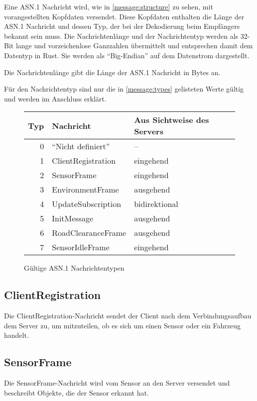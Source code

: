 Eine ASN.1 Nachricht wird, wie in \autoref{message:structure} zu sehen, mit  vorangestellten Kopfdaten versendet.
Diese Kopfdaten enthalten die Länge der ASN.1 Nachricht und dessen Typ, der bei der Dekodierung beim Empfängers bekannt sein muss.
Die Nachrichtenlänge und der Nachrichtentyp werden als 32-Bit lange und vorzeichenlose Ganzzahlen übermittelt und entsprechen damit dem Datentyp  in Rust.
Sie werden als \enquote{Big-Endian} auf dem Datenstrom dargestellt.

Die Nachrichtenlänge gibt die Länge der ASN.1 Nachricht in Bytes an.

Für den Nachrichtentyp sind nur die in \autoref{message:types} gelisteten Werte gültig und werden im Anschluss erklärt.

\begin{figure}[H]
	\centering
	\begin{tabular}{r|l|l}
		Typ & Nachricht & Aus Sichtweise des Servers \\
		\hline
		0 & \enquote{Nicht definiert} & -- \\
		1 & ClientRegistration & eingehend \\
		2 & SensorFrame & eingehend \\
		3 & EnvironmentFrame & ausgehend \\
		4 & UpdateSubscription & bidirektional \\
		5 & InitMessage & ausgehend \\
		6 & RoadClearanceFrame & ausgehend \\
		7 & SensorIdleFrame & eingehend \\
	\end{tabular}
	\caption{Gültige ASN.1 Nachrichtentypen}
	\label{message:types}
\end{figure}

\subsection{ClientRegistration}
\label{msg:client_registration}

Die ClientRegistration-Nachricht sendet der Client nach dem Verbindungsaufbau dem Server zu, um mitzuteilen, ob es sich um einen Sensor oder ein Fahrzeug handelt.

\subsection{SensorFrame}
\label{msg:sensor_frame}

Die SensorFrame-Nachricht wird vom Sensor an den Server versendet und beschreibt Objekte, die der Sensor erkannt hat.

